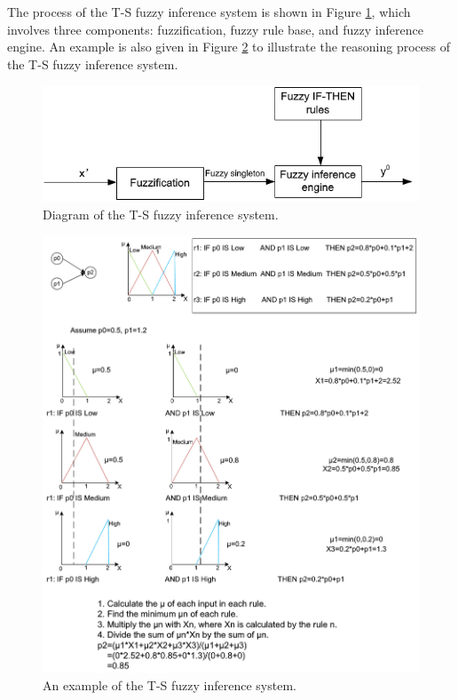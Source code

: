 \documentclass[journal,a4paper,onecolumn]{article}
\begin{document}
The process of the T-S fuzzy inference system is shown in Figure \ref{fig:diagram-T-S}, which involves three components: fuzzification, fuzzy rule base, and fuzzy inference engine. An example is also given in Figure \ref{fig:example-T-S} to illustrate the reasoning process of the T-S fuzzy inference system.

\begin{figure}[!hbt]
	\begin{center}
		\includegraphics[width=0.5\columnwidth]{fig49}
		\caption{Diagram of the T-S fuzzy inference system.}
		\label{fig:diagram-T-S}
	\end{center}
\end{figure}

\begin{figure}[!hbt]
	\begin{center}
		\includegraphics[width=\columnwidth]{fuzzy_logic_example1}
		\caption{An example of the T-S fuzzy inference system.}
		\label{fig:example-T-S}
	\end{center}
\end{figure}
\end{document}
